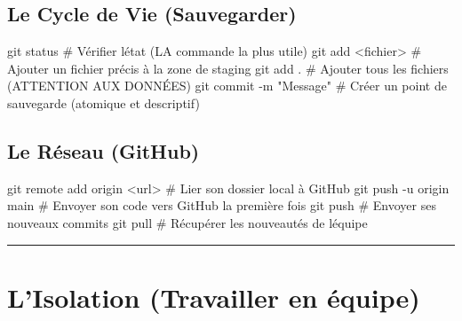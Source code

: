\documentclass[
  letterpaper,
  DIV=11,
  numbers=noendperiod]{scrreprt}
\newenvironment{Shaded}{\begin{snugshade}}{\end{snugshade}}
\newcommand{\AlertTok}[1]{\textcolor[rgb]{0.68,0.00,0.00}{#1}}
\newcommand{\AttributeTok}[1]{\textcolor[rgb]{0.40,0.45,0.13}{#1}}
\newcommand{\CommentTok}[1]{\textcolor[rgb]{0.37,0.37,0.37}{#1}}
\newcommand{\FunctionTok}[1]{\textcolor[rgb]{0.28,0.35,0.67}{#1}}
\newcommand{\NormalTok}[1]{\textcolor[rgb]{0.00,0.23,0.31}{#1}}
\newcommand{\OperatorTok}[1]{\textcolor[rgb]{0.37,0.37,0.37}{#1}}
\newcommand{\StringTok}[1]{\textcolor[rgb]{0.13,0.47,0.30}{#1}}
\begin{document}
\subsection{Le Cycle de Vie
(Sauvegarder)}\label{le-cycle-de-vie-sauvegarder}

\begin{Shaded}
\begin{Highlighting}[]
\FunctionTok{git}\NormalTok{ status               }\CommentTok{\# Vérifier l\textquotesingle{}état (LA commande la plus utile)}
\FunctionTok{git}\NormalTok{ add }\OperatorTok{\textless{}}\NormalTok{fichier}\OperatorTok{\textgreater{}}        \CommentTok{\# Ajouter un fichier précis à la zone de staging}
\FunctionTok{git}\NormalTok{ add .                }\CommentTok{\# Ajouter tous les fichiers (}\AlertTok{ATTENTION}\CommentTok{ AUX DONNÉES)}
\FunctionTok{git}\NormalTok{ commit }\AttributeTok{{-}m} \StringTok{"Message"}  \CommentTok{\# Créer un point de sauvegarde (atomique et descriptif)}
\end{Highlighting}
\end{Shaded}

\subsection{Le Réseau (GitHub)}\label{le-ruxe9seau-github}

\begin{Shaded}
\begin{Highlighting}[]
\FunctionTok{git}\NormalTok{ remote add origin }\OperatorTok{\textless{}}\NormalTok{url}\OperatorTok{\textgreater{}} \CommentTok{\# Lier son dossier local à GitHub}
\FunctionTok{git}\NormalTok{ push }\AttributeTok{{-}u}\NormalTok{ origin main     }\CommentTok{\# Envoyer son code vers GitHub la première fois}
\FunctionTok{git}\NormalTok{ push                    }\CommentTok{\# Envoyer ses nouveaux commits}
\FunctionTok{git}\NormalTok{ pull                    }\CommentTok{\# Récupérer les nouveautés de l\textquotesingle{}équipe}
\end{Highlighting}
\end{Shaded}

\begin{center}\rule{0.5\linewidth}{0.5pt}\end{center}


\section{L'Isolation (Travailler en
équipe)}\label{lisolation-travailler-en-uxe9quipe}
\end{document}
